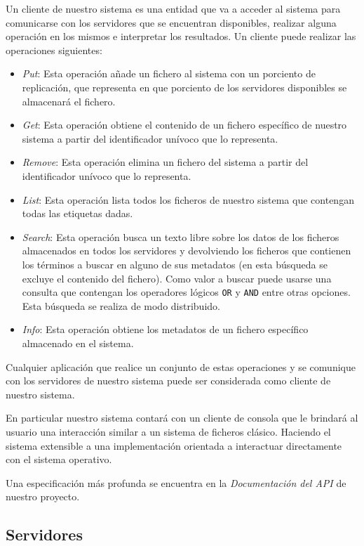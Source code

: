 \documentclass{article}
\begin{document}
Un cliente de nuestro sistema es una entidad que va a acceder al sistema para
comunicarse con los servidores que se encuentran disponibles, realizar alguna
operación en los mismos e interpretar los resultados. Un cliente puede realizar
las operaciones siguientes:

\begin{itemize}
  \item \emph{Put}: Esta operación añade un fichero al sistema con
  un porciento de replicación, que representa en que porciento de los
  servidores disponibles se almacenará el fichero.
  \item \emph{Get}: Esta operación obtiene el contenido de un fichero específico
  de nuestro sistema a partir del identificador unívoco que lo representa.
  \item \emph{Remove}: Esta operación elimina un fichero del sistema a partir
  del identificador unívoco que lo representa.
  \item \emph{List}: Esta operación lista todos los ficheros de nuestro sistema
  que contengan todas las etiquetas dadas.
  \item \emph{Search}: Esta operación busca un texto libre sobre los datos
  de los ficheros almacenados en todos los servidores y devolviendo los
  ficheros que contienen los términos a buscar en alguno de sus metadatos (en
  esta búsqueda se excluye el contenido del fichero). Como valor a buscar puede
  usarse una consulta que contengan los operadores lógicos \verb|OR| y
  \verb|AND| entre otras opciones. Esta búsqueda se realiza de modo
  distribuido.
  \item \emph{Info}: Esta operación obtiene los metadatos de un fichero
  específico almacenado en el sistema.
\end{itemize}

Cualquier aplicación que realice un conjunto de estas operaciones y se
comunique con los servidores de nuestro sistema puede ser considerada como
cliente de nuestro sistema.

En particular nuestro sistema contará con un cliente de consola que le brindará
al usuario una interacción similar a un sistema de ficheros clásico. Haciendo
el sistema extensible a una implementación orientada a interactuar directamente
con el sistema operativo.

Una especificación más profunda se encuentra en la \emph{Documentación del API}
de nuestro proyecto.

\subsection{Servidores}
\end{document}
